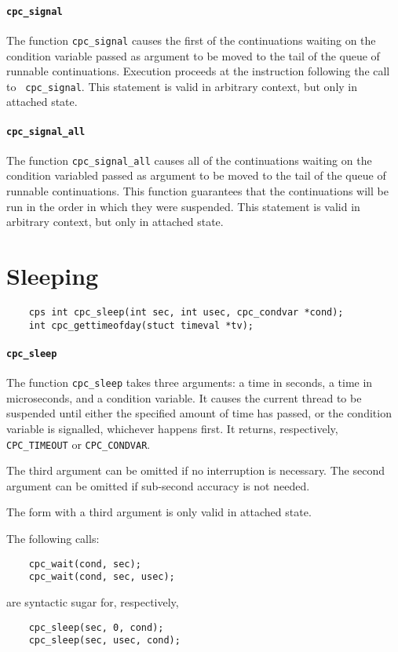 \documentclass[a4paper]{report}
\begin{document}
\paragraph{\tt cpc\_signal} The function {\tt cpc\_signal} causes the
first of the continuations waiting on the condition variable passed as
argument to be moved to the tail of the queue of runnable continuations.
Execution proceeds at the instruction following the call to {\tt
  cpc\_signal}.  This statement is valid in arbitrary context, but only in
attached state.

\paragraph{\tt cpc\_signal\_all} The function {\tt cpc\_signal\_all}
causes all of the continuations waiting on the condition variabled passed
as argument to be moved to the tail of the queue of runnable continuations.
This function guarantees that the continuations will be run in the order in
which they were suspended.  This statement is valid in arbitrary context,
but only in attached state.

\section{Sleeping}

\begin{verbatim}
    cps int cpc_sleep(int sec, int usec, cpc_condvar *cond);
    int cpc_gettimeofday(stuct timeval *tv);
\end{verbatim}

\paragraph{\tt cpc\_sleep} The function {\tt cpc\_sleep} takes three
arguments: a time in seconds, a time in microseconds, and a condition
variable.  It causes the current thread to be suspended until
either the specified amount of time has passed, or the condition
variable is signalled, whichever happens first.  It returns,
respectively, {\tt CPC\_TIMEOUT} or {\tt CPC\_CONDVAR}.

The third argument can be omitted if no interruption is necessary.
The second argument can be omitted if sub-second accuracy is not
needed.

The form with a third argument is only valid in attached state.

The following calls:
\begin{verbatim}
    cpc_wait(cond, sec);
    cpc_wait(cond, sec, usec);
\end{verbatim}
are syntactic sugar for, respectively,
\begin{verbatim}
    cpc_sleep(sec, 0, cond);
    cpc_sleep(sec, usec, cond);
\end{verbatim}
\end{document}
